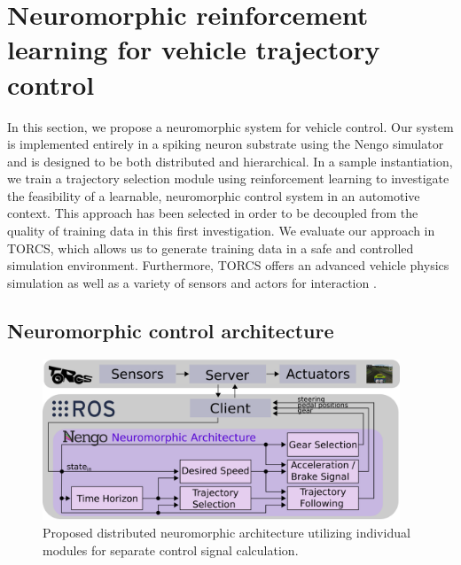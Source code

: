 \section{Neuromorphic reinforcement learning for vehicle trajectory control}%
\label{sec:neuromorphic_reinforcement_learning_for_vehicle_trajectory_control}

In this section, we propose a neuromorphic system for vehicle control.
Our system is implemented entirely in a spiking neuron substrate using the \ac{Nengo} simulator \parencite{Bekolay2014} and is designed to be both distributed and hierarchical.
In a sample instantiation, we train a trajectory selection module using reinforcement learning to investigate the feasibility of a learnable, neuromorphic control system in an automotive context.
This approach has been selected in order to be decoupled from the quality of training data in this first investigation.
We evaluate our approach in \ac{TORCS}, which allows us to generate training data in a safe and controlled simulation environment.
Furthermore, \ac{TORCS} offers an advanced vehicle physics simulation as well as a variety of sensors and actors for interaction \parencite{TORCS}.

\subsection{Neuromorphic control architecture}%
\label{subsec:neuromorphic_control_architecture}

\begin{figure}[t!]
\centering
  \includegraphics[width=0.95\textwidth]{imgs/Distributed-System-narrow.eps}
\caption{Proposed distributed neuromorphic architecture utilizing individual modules for separate control signal calculation. \label{fig:architecture}}
\end{figure}

